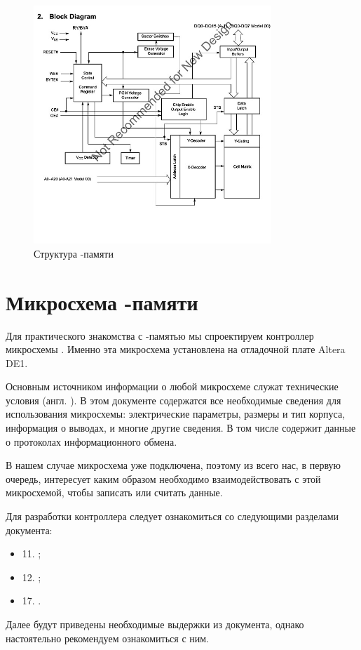 \begin{figure}[H]
\centering
% 
\includegraphics[width=0.8\textwidth]{images/lab_6/flash_block_diagram}
\caption{Структура -памяти }
\label{fig:flash_block_diagram}
\end{figure}

\section{Микросхема -памяти }

\par{Для практического знакомства с -памятью мы спроектируем контроллер микросхемы . Именно эта микросхема установлена на отладочной плате Altera DE1.}
\par{Основным источником информации о любой микросхеме служат технические условия (англ. ). В этом документе содержатся все необходимые сведения для использования микросхемы: электрические параметры, размеры и тип корпуса, информация о выводах, и многие другие сведения. В том числе  содержит данные о протоколах информационного обмена.}
\par{В нашем случае микросхема уже подключена, поэтому из всего  нас, в первую очередь, интересует каким образом необходимо взаимодействовать с этой микросхемой, чтобы записать или считать данные.}
\par{Для разработки контроллера следует ознакомиться со следующими разделами документа:
\begin{itemize}[noitemsep,label={}]
  \item 11. ;
  \item 12. ;
  \item 17. .
\end{itemize}}
\par{Далее будут приведены необходимые выдержки из документа, однако настоятельно рекомендуем ознакомиться с ним.}

